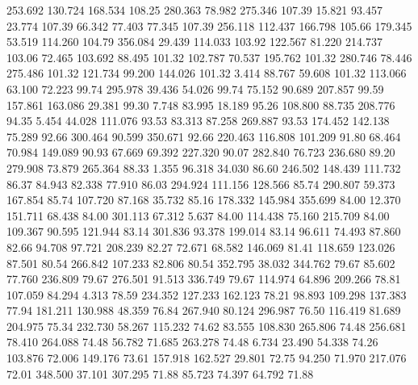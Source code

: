  253.692  130.724  168.534       108.25
 280.363   78.982  275.346       107.39
  15.821   93.457   23.774       107.39
  66.342   77.403   77.345       107.39
 256.118  112.437  166.798       105.66
 179.345   53.519  114.260       104.79
 356.084   29.439  114.033       103.92
 122.567   81.220  214.737       103.06
  72.465  103.692   88.495       101.32
 102.787   70.537  195.762       101.32
 280.746   78.446  275.486       101.32
 121.734   99.200  144.026       101.32
   3.414   88.767   59.608       101.32
 113.066   63.100   72.223        99.74
 295.978   39.436   54.026        99.74
  75.152   90.689  207.857        99.59
 157.861  163.086   29.381        99.30
   7.748   83.995   18.189        95.26
 108.800   88.735  208.776        94.35
   5.454   44.028  111.076        93.53
  83.313   87.258  269.887        93.53
 174.452  142.138   75.289        92.66
 300.464   90.599  350.671        92.66
 220.463  116.808  101.209        91.80
  68.464   70.984  149.089        90.93
  67.669   69.392  227.320        90.07
 282.840   76.723  236.680        89.20
 279.908   73.879  265.364        88.33
   1.355   96.318   34.030        86.60
 246.502  148.439  111.732        86.37
  84.943   82.338   77.910        86.03
 294.924  111.156  128.566        85.74
 290.807   59.373  167.854        85.74
 107.720   87.168   35.732        85.16
 178.332  145.984  355.699        84.00
  12.370  151.711   68.438        84.00
 301.113   67.312    5.637        84.00
 114.438   75.160  215.709        84.00
 109.367   90.595  121.944        83.14
 301.836   93.378  199.014        83.14
  96.611   74.493   87.860        82.66
  94.708   97.721  208.239        82.27
  72.671   68.582  146.069        81.41
 118.659  123.026   87.501        80.54
 266.842  107.233   82.806        80.54
 352.795   38.032  344.762        79.67
  85.602   77.760  236.809        79.67
 276.501   91.513  336.749        79.67
 114.974   64.896  209.266        78.81
 107.059   84.294    4.313        78.59
 234.352  127.233  162.123        78.21
  98.893  109.298  137.383        77.94
 181.211  130.988   48.359        76.84
 267.940   80.124  296.987        76.50
 116.419   81.689  204.975        75.34
 232.730   58.267  115.232        74.62
  83.555  108.830  265.806        74.48
 256.681   78.410  264.088        74.48
  56.782   71.685  263.278        74.48
   6.734   23.490   54.338        74.26
 103.876   72.006  149.176        73.61
 157.918  162.527   29.801        72.75
  94.250   71.970  217.076        72.01
 348.500   37.101  307.295        71.88
  85.723   74.397   64.792        71.88
